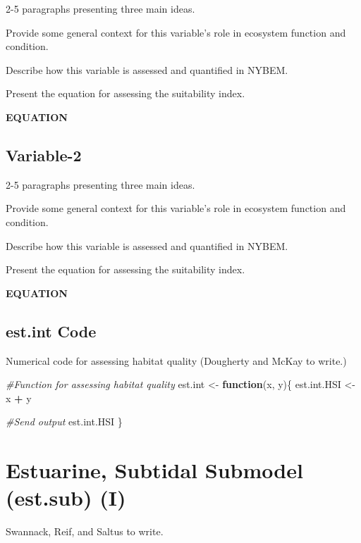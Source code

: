 \documentclass[
]{book}
\newenvironment{Shaded}{\begin{snugshade}}{\end{snugshade}}
\newcommand{\CommentTok}[1]{\textcolor[rgb]{0.56,0.35,0.01}{\textit{#1}}}
\newcommand{\ControlFlowTok}[1]{\textcolor[rgb]{0.13,0.29,0.53}{\textbf{#1}}}
\newcommand{\NormalTok}[1]{#1}
\newcommand{\OperatorTok}[1]{\textcolor[rgb]{0.81,0.36,0.00}{\textbf{#1}}}
\newcommand{\StringTok}[1]{\textcolor[rgb]{0.31,0.60,0.02}{#1}}
\begin{document}
2-5 paragraphs presenting three main ideas.

Provide some general context for this variable's role in ecosystem function and condition.

Describe how this variable is assessed and quantified in NYBEM.

Present the equation for assessing the suitability index.

\textbf{EQUATION}

\hypertarget{variable-2}{%
\subsection{Variable-2}\label{variable-2}}

2-5 paragraphs presenting three main ideas.

Provide some general context for this variable's role in ecosystem function and condition.

Describe how this variable is assessed and quantified in NYBEM.

Present the equation for assessing the suitability index.

\textbf{EQUATION}

\hypertarget{est.int-code}{%
\subsection{est.int Code}\label{est.int-code}}

Numerical code for assessing habitat quality ({Dougherty and McKay to write.})

\begin{Shaded}
\begin{Highlighting}[]
\CommentTok{#Function for assessing habitat quality}
\NormalTok{est.int <-}\StringTok{ }\ControlFlowTok{function}\NormalTok{(x, y)\{}
\NormalTok{  est.int.HSI <-}\StringTok{ }\NormalTok{x }\OperatorTok{+}\StringTok{ }\NormalTok{y}

  \CommentTok{#Send output}
\NormalTok{  est.int.HSI}
\NormalTok{\}}
\end{Highlighting}
\end{Shaded}

\hypertarget{estuarine-subtidal-submodel-est.sub-i}{%
\section{Estuarine, Subtidal Submodel (est.sub) (I)}\label{estuarine-subtidal-submodel-est.sub-i}}

{Swannack, Reif, and Saltus to write.}
\end{document}
